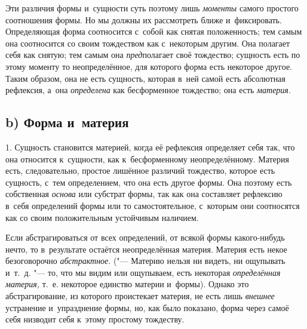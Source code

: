Эти различия формы и~сущности суть поэтому лишь {\em моменты} самого простого
соотношения формы. Но мы должны их рассмотреть ближе и~фиксировать.
Определяющая форма соотносится с~собой как снятая положенность; тем самым она
соотносится со своим тождеством как с~некоторым другим. Она полагает себя как
снятую; тем самым она {\em пред}полагает своё тождество; сущность есть по этому
моменту то неопределённое, для которого форма есть некоторое другое. Таким
образом, она не есть сущность, которая в~ней самой есть абсолютная рефлексия,
а~она {\em определена} как бесформенное тождество; она есть {\em материя}.

\subsection[b) Форма и~материя]{b) Форма и~материя}

1. Сущность становится материей, когда её рефлексия определяет себя так, что
она относится к~сущности, как к~бесформенному неопределённому. Материя есть,
следовательно, простое лишённое различий тождество, которое есть сущность,
с~тем определением, что она есть другое формы. Она поэтому есть собственная
{\em основа} или субстрат формы, так как она составляет рефлексию в~себя
определений формы или то самостоятельное, с~которым они соотносятся как со
своим положительным устойчивым наличием.

Если абстрагироваться от всех определений, от всякой формы какого-нибудь нечто,
то в~результате остаётся неопределённая материя. Материя есть некое
безоговорочно {\em абстрактное}. ("--- Материю нельзя ни видеть, ни ощупывать
и~т.~д. "--- то, что мы видим или ощупываем, есть некоторая {\em определённая
материя,} т.~е. некоторое единство материи и~формы). Однако это
абстрагирование, из которого проистекает материя, не есть лишь {\em внешнее}
устранение и~упразднение формы, но, как было показано, форма через самоё себя
низводит себя к~этому простому тождеству.

